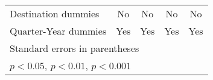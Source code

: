 \begin{table}[htbp]
\begin{tabular}{l*{4}{c}}
Destination dummies &          No         &          No         &          No         &          No         \\
Quarter-Year dummies&         Yes         &         Yes         &         Yes         &         Yes         \\
\hline\hline
\multicolumn{5}{l}{\footnotesize Standard errors in parentheses}\\
\multicolumn{5}{l}{\footnotesize \sym{*} \(p<0.05\), \sym{**} \(p<0.01\), \sym{***} \(p<0.001\)}\\
\end{tabular}
\end{table}
